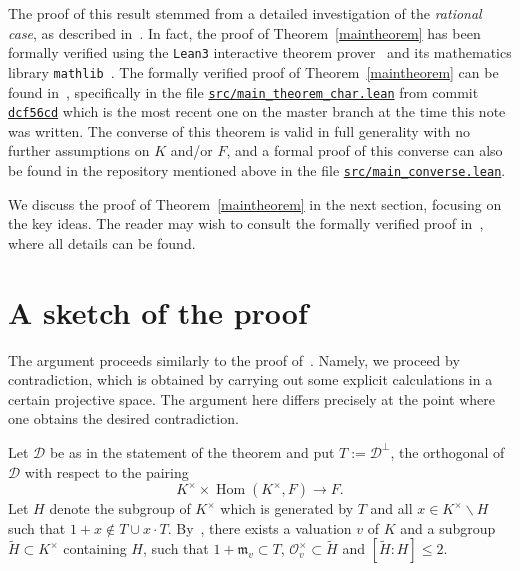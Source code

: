 \documentclass[12pt]{amsart}
\newcommand{\Hom}{\operatorname{Hom}}
\newcommand{\Dcal}{\mathcal{D}}
\newcommand{\smin}{\smallsetminus}
\newcommand{\mfrak}{\mathfrak{m}}
\newcommand{\Ocal}{\mathcal{O}}
\renewcommand{\tilde}{\widetilde}
\begin{document}
The proof of this result stemmed from a detailed investigation of the \emph{rational case}, as described in~\cite[\S A]{https://doi.org/10.48550/arxiv.1705.01084}.
In fact, the proof of Theorem~\ref{maintheorem} has been formally verified using the \texttt{Lean3} interactive theorem prover~\cite{10.1007/978-3-319-21401-6_26} and its mathematics library \texttt{mathlib}~\cite{10.1145/3372885.3373824}.
The formally verified proof of Theorem~\ref{maintheorem} can be found in~\cite{lean-acl-pairs}, specifically in the file \href{https://github.com/adamtopaz/lean-acl-pairs/blob/dcf56cd/src/main_theorem_char.lean}{\texttt{src/main\_theorem\_char.lean}} from commit \href{https://github.com/adamtopaz/lean-acl-pairs/tree/dcf56cd}{\texttt{dcf56cd}} which is the most recent one on the master branch at the time this note was written.
The converse of this theorem is valid in full generality with no further assumptions on $K$ and/or $F$, and a formal proof of this converse can also be found in the repository mentioned above in the file \href{https://github.com/adamtopaz/lean-acl-pairs/blob/dcf56cd/src/main_converse.lean}{\texttt{src/main\_converse.lean}}.

We discuss the proof of Theorem~\ref{maintheorem} in the next section, focusing on the key ideas.
The reader may wish to consult the formally verified proof in~\cite{lean-acl-pairs}, where all details can be found.

\section{A sketch of the proof}

The argument proceeds similarly to the proof of~\cite[Theorem~A.3]{https://doi.org/10.48550/arxiv.1705.01084}.
Namely, we proceed by contradiction, which is obtained by carrying out some explicit calculations in a certain projective space.
The argument here differs precisely at the point where one obtains the desired contradiction.

Let $\Dcal$ be as in the statement of the theorem and put $T := \Dcal^{\perp}$, the orthogonal of $\Dcal$ with respect to the pairing
\[ K^{\times} \times \Hom(K^{\times},F) \to F. \]
Let $H$ denote the subgroup of $K^{\times}$ which is generated by $T$ and all $x \in K^{\times} \smin H$ such that $1 + x \notin T \cup x \cdot T$.
By~\cite[Theorem 2.16]{zbMATH04023378}, there exists a valuation $v$ of $K$ and a subgroup $\tilde H \subset K^{\times}$ containing $H$, such that $1 + \mfrak_{v} \subset T$, $\Ocal_{v}^{\times} \subset \tilde H$ and $[\tilde H : H] \le 2$.
\end{document}
